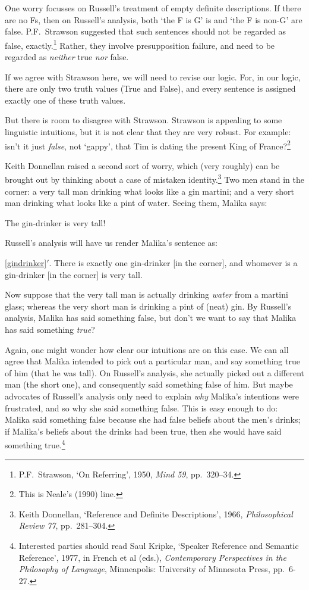 One worry focusses on Russell's treatment of empty definite descriptions. If there are no Fs, then on Russell's analysis, both `the F is G' is and  `the F is non-G' are false. P.F.\ Strawson suggested that such sentences should not be regarded as false, exactly.\footnote{P.F.\ Strawson, `On Referring', 1950, \emph{Mind 59}, pp.\ 320--34.} Rather, they involve presupposition failure, and need to be regarded as \emph{neither} true \emph{nor} false. 

If we agree with Strawson here, we will need to revise our logic. For, in our logic, there are only two truth values (True and False), and every sentence is assigned exactly one of these truth values. 

But there is room to disagree with Strawson. Strawson is appealing to some linguistic intuitions, but it is not clear that they are very robust. For example: isn't it just \emph{false}, not `gappy', that Tim is dating the present King of France?\footnote{This is Neale's (1990) line.}

Keith Donnellan raised a second sort of worry, which (very roughly) can be brought out by thinking about a case of mistaken identity.\footnote{Keith Donnellan, `Reference and Definite Descriptions', 1966, \emph{Philosophical Review 77}, pp.\ 281--304.} Two men stand in the corner: a very tall man drinking what looks like a gin martini; and a very short man drinking what looks like a pint of water. Seeing them, Malika says:
	\begin{earg}
		\item[\ex{gindrinker}] The gin-drinker is very tall!
	\end{earg}
Russell's analysis will have us render Malika's sentence as:
	\begin{earg}
		\item[\ref{gindrinker}$'$.] There is exactly one gin-drinker [in the corner], and whomever is a gin-drinker [in the corner] is very tall.
	\end{earg}
Now suppose that the very tall man is actually drinking \emph{water} from a martini glass; whereas the very short man is drinking a pint of (neat) gin. By Russell's analysis, Malika has said something false, but don't we want to say that Malika has said something \emph{true}? 

Again, one might wonder how clear our intuitions are on this case. We can all agree that Malika intended to pick out a particular man, and say something true of him (that he was tall). On Russell's analysis, she actually picked out a different man (the short one), and consequently said something false of him. But  maybe advocates of Russell's analysis only need to explain \emph{why} Malika's intentions were frustrated, and so why she said something false. This is easy enough to do:  Malika said something false because she had false beliefs about the men's drinks; if Malika's beliefs about the drinks had been true,  then she would have said something true.\footnote{Interested parties should read Saul Kripke, `Speaker Reference and Semantic Reference', 1977, in French et al (eds.), \emph{Contemporary Perspectives in the Philosophy of Language}, Minneapolis: University of Minnesota Press, pp.\ 6-27.}

